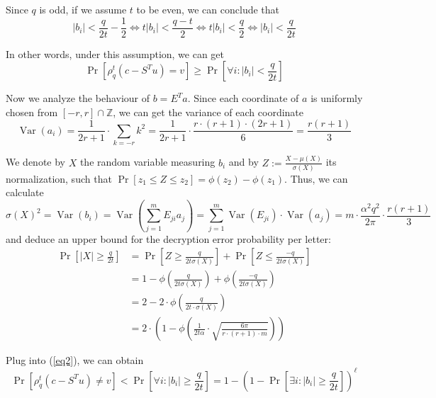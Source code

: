 Since $q$ is odd, if we assume $t$ to be even, we can conclude that
$$\left|b_{i}\right|<\frac{q}{2 t}-\frac{1}{2} \Leftrightarrow t\left|b_{i}\right|<\frac{q-t}{2} \Leftrightarrow t\left|b_{i}\right|<\frac{q}{2} \Leftrightarrow\left|b_{i}\right|<\frac{q}{2 t}$$

In other words, under this assumption, we can get
\begin{equation}
    \operatorname{Pr}\left[\rho_{q}^{t}\left(c-S^{T} u\right)=v\right] \geq \operatorname{Pr}\left[\forall i :\left|b_{i}\right|<\frac{q}{2 t}\right]\label{eq2}
\end{equation}

Now we analyze the behaviour of $b=E^{T} a$. Since each coordinate of $a$ is uniformly chosen from $[-r, r] \cap \mathbb{Z}$, we can get the variance of each coordinate
$$\operatorname{Var}\left(a_{i}\right)=\frac{1}{2 r+1} \cdot \sum_{k=-r} k^{2}=\frac{1}{2 r+1} \cdot \frac{r \cdot(r+1) \cdot(2 r+1)}{6}=\frac{r(r+1)}{3}$$

We denote by $X$ the random variable measuring $b_{i}$ and by $Z :=\frac{X-\mu(X)}{\sigma(X)}$ its normalization, such that $\operatorname{Pr}\left[z_{1} \leq Z \leq z_{2}\right]=\phi\left(z_{2}\right)-\phi\left(z_{1}\right) .$ Thus, we can calculate
    $$\sigma(X)^{2}=\operatorname{Var}\left(b_{i}\right)=\operatorname{Var}\left(\sum_{j=1}^{m} E_{j i} a_{j}\right)=\sum_{j=1}^{m} \operatorname{Var}\left(E_{j i}\right) \cdot \operatorname{Var}\left(a_{j}\right)=m \cdot \frac{\alpha^{2} q^{2}}{2 \pi} \cdot \frac{r(r+1)}{3}$$
and deduce an upper bound for the decryption error probability per letter:
\begin{align*}
    \operatorname{Pr}\left[|X| \geq \frac{q}{2 t}\right]&=\operatorname{Pr}\left[Z \geq \frac{q}{2 t \sigma(X)}\right]+\operatorname{Pr}\left[Z \leq \frac{-q}{2 t \sigma(X)}\right]\\
    &=1-\phi\left(\frac{q}{2 t \sigma(X)}\right)+\phi\left(\frac{-q}{2 t \sigma(X)}\right)\\
    &=2-2 \cdot \phi\left(\frac{q}{2 t \cdot \sigma(X)}\right)\\
    &=2 \cdot\left(1-\phi\left(\frac{1}{2 t \alpha} \cdot \sqrt{\frac{6 \pi}{r \cdot(r+1) \cdot m}}\right)\right)
\end{align*}

Plug into (\ref{eq2}), we can obtain
$$\operatorname{Pr}\left[\rho_{q}^{t}\left(c-S^{T} u\right) \neq v\right]<\operatorname{Pr}\left[\forall i :\left|b_{i}\right| \geq \frac{q}{2 t}\right]=1-\left(1-\operatorname{Pr}\left[\exists i :\left|b_{i}\right| \geq \frac{q}{2 t}\right]\right)^{\ell}$$

